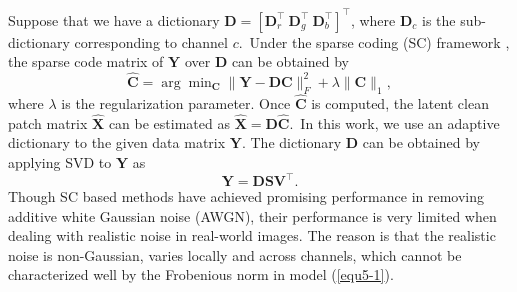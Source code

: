 Suppose that we have a dictionary $\bm{D}=[\bm{D}_{r}^{\top}\ \bm{D}_{g}^{\top}\ \bm{D}_{b}^{\top}]^{\top}$, where $\bm{D}_{c}$ is the sub-dictionary corresponding to channel $c$.\ Under the sparse coding (SC) framework \cite{lasso}, the sparse code matrix of $\bm{Y}$ over $\bm{D}$ can be obtained by
\begin{equation}
\label{equ5-1}
\hat{\bm{C}}
=
\arg\min\nolimits_{\bm{C}}
\|\bm{Y}-\bm{D}\bm{C}\|_{F}^{2}
+
\lambda\|\bm{C}\|_{1},
\end{equation}
where $\lambda$ is the regularization parameter. Once $\hat{\bm{C}}$ is computed,
the latent clean patch matrix $\hat{\bm{X}}$ can be estimated as $\hat{\bm{X}}=\bm{D}\hat{\bm{C}}$.\ In this work, we use an adaptive dictionary to the given data matrix $\bm{Y}$. The dictionary $\bm{D}$ can be obtained by applying SVD to $\bm{Y}$ as 
\begin{equation}
\label{equ5-2}
\bm{Y} =\bm{D}\bm{S}\bm{V}^{\top}.
\end{equation}
Though SC based methods \cite{ksvd,lssc,ncsr} have achieved promising performance in removing additive white Gaussian noise (AWGN), their performance is very limited when dealing with realistic noise in real-world images. The reason is that the realistic noise is non-Gaussian, varies locally and across channels, which cannot be characterized well by the Frobenious norm in model (\ref{equ5-1}).  

